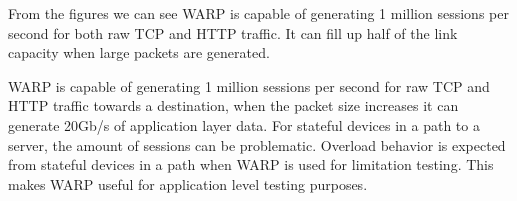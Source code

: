 From the figures we can see WARP is capable of generating 1 million sessions per second for both raw TCP and HTTP traffic. 
It can fill up half of the link capacity when large packets are generated.

WARP is capable of generating 1 million sessions per second for raw TCP and HTTP traffic towards a destination, when the packet size increases it can generate 20Gb/s of application layer data.
For stateful devices in a path to a server, the amount of sessions can be problematic. Overload behavior is expected from stateful devices in a path when WARP is used for limitation testing.  
This makes WARP useful for application level testing purposes. 

